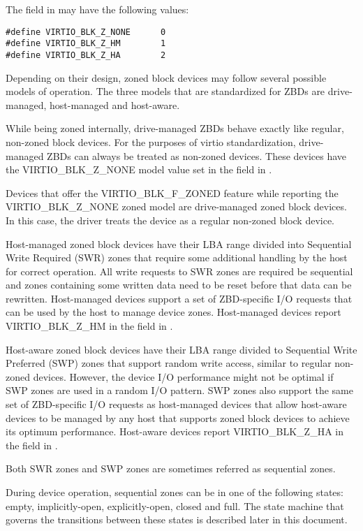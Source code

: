 The  field in  may have the following values:

\begin{lstlisting}
#define VIRTIO_BLK_Z_NONE      0
#define VIRTIO_BLK_Z_HM        1
#define VIRTIO_BLK_Z_HA        2
\end{lstlisting}

Depending on their design, zoned block devices may follow several possible
models of operation. The three models that are standardized for ZBDs are
drive-managed, host-managed and host-aware.

While being zoned internally, drive-managed ZBDs behave exactly like regular,
non-zoned block devices. For the purposes of virtio standardization,
drive-managed ZBDs can always be treated as non-zoned devices. These devices
have the VIRTIO_BLK_Z_NONE model value set in the  field in
.

Devices that offer the VIRTIO_BLK_F_ZONED feature while reporting the
VIRTIO_BLK_Z_NONE zoned model are drive-managed zoned block devices. In this
case, the driver treats the device as a regular non-zoned block device.

Host-managed zoned block devices have their LBA range divided into Sequential
Write Required (SWR) zones that require some additional handling by the host
for correct operation. All write requests to SWR zones are required be
sequential and zones containing some written data need to be reset before that
data can be rewritten. Host-managed devices support a set of ZBD-specific I/O
requests that can be used by the host to manage device zones. Host-managed
devices report VIRTIO_BLK_Z_HM in the  field in .

Host-aware zoned block devices have their LBA range divided to Sequential
Write Preferred (SWP) zones that support random write access, similar to
regular non-zoned devices. However, the device I/O performance might not be
optimal if SWP zones are used in a random I/O pattern. SWP zones also support
the same set of ZBD-specific I/O requests as host-managed devices that allow
host-aware devices to be managed by any host that supports zoned block devices
to achieve its optimum performance. Host-aware devices report VIRTIO_BLK_Z_HA
in the  field in .

Both SWR zones and SWP zones are sometimes referred as sequential zones.

During device operation, sequential zones can be in one of the following states:
empty, implicitly-open, explicitly-open, closed and full. The state machine that
governs the transitions between these states is described later in this document.

